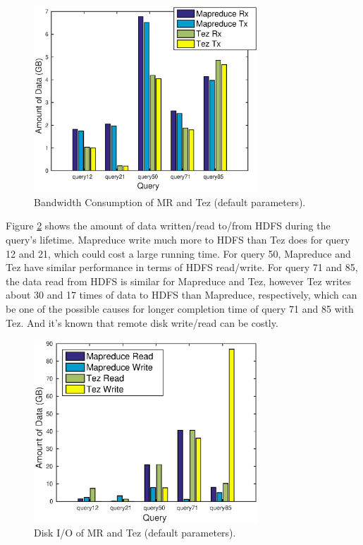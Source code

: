 \documentclass[10pt]{article}
\begin{document}
\begin{figure}
\begin{center}
\includegraphics[width=0.75\textwidth]{pic/q1b_net}
\caption{Bandwidth Consumption of MR and Tez (default parameters).}
\label{fig:q1b_net}
\end{center}
\end{figure}

Figure \ref{fig:q1b_disk} shows the amount of data written/read to/from HDFS during the query's lifetime. Mapreduce write much more to HDFS than Tez does for query 12 and 21, which could cost a large running time. For query 50, Mapreduce and Tez have similar performance in terms of HDFS read/write. For query 71 and 85, the data read from HDFS is similar for Mapreduce and Tez, however Tez writes about 30 and 17 times of data to HDFS than Mapreduce, respectively, which can be one of the possible causes for longer completion time of query 71 and 85 with Tez. And it's known that remote disk write/read can be costly.

\begin{figure}
\begin{center}
\includegraphics[width=0.75\textwidth]{pic/q1b_disk}
\caption{Disk I/O of MR and Tez (default parameters).}
\label{fig:q1b_disk}
\end{center}
\end{figure}
\end{document}
